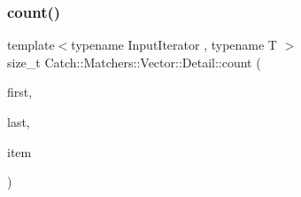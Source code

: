 \mbox{\label{namespace_catch_1_1_matchers_1_1_vector_1_1_detail_abca18680db20c92f848b02a2c2708852}} 
\subsubsection{\texorpdfstring{count()}{count()}}
{\footnotesize\ttfamily template$<$typename Input\+Iterator , typename T $>$ \\
size\+\_\+t Catch\+::\+Matchers\+::\+Vector\+::\+Detail\+::count (\begin{DoxyParamCaption}\item[{Input\+Iterator}]{first,  }\item[{Input\+Iterator}]{last,  }\item[{T const \&}]{item }\end{DoxyParamCaption})}


